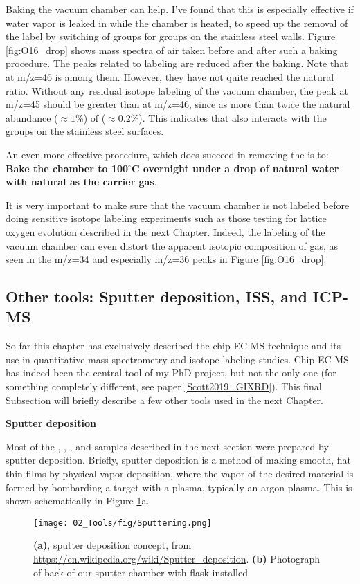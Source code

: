 Baking the vacuum chamber can help. I've found that this is especially effective if water vapor is leaked in while the chamber is heated, to speed up the removal of the  label by switching of  groups for  groups on the stainless steel walls. Figure \ref{fig:O16_drop} shows mass spectra of air taken before and after such a baking procedure. The peaks related to  labeling are reduced after the baking. Note that  at m/z=46 is among them. However, they have not quite reached the natural ratio. Without any residual isotope labeling of the vacuum chamber, the peak at m/z=45 should be greater than at m/z=46, since  as more than twice the natural abundance ($\approx 1$\%) of  ($\approx 0.2$\%). This indicates that  also interacts with the  groups on the stainless steel surfaces. 

An even more effective procedure, which does succeed in removing the  is to: \textbf{Bake the chamber to 100$^\circ$C overnight under a drop of natural water with natural  as the carrier gas}. 

It is very important to make sure that the vacuum chamber is not labeled before doing sensitive isotope labeling experiments such as those testing for lattice oxygen evolution described in the next Chapter. Indeed, the labeling of the vacuum chamber can even distort the apparent isotopic composition of  gas, as seen in the m/z=34 and especially m/z=36 peaks in Figure \ref{fig:O16_drop}.

\subsection{Other tools: Sputter deposition, ISS, and ICP-MS}\label{subsec:other_tools}

So far this chapter has exclusively described the chip EC-MS technique and its use in quantitative mass spectrometry and isotope labeling studies. Chip EC-MS has indeed been the central tool of my PhD project, but not the only one (for something completely different, see paper \ref{Scott2019_GIXRD}). This final Subsection will briefly describe a few other tools used in the next Chapter.

\textbf{Sputter deposition}

Most of the , , , and  samples described in the next section were prepared by sputter deposition. Briefly, sputter deposition is a method of making smooth, flat thin films by physical vapor deposition, where the vapor of the desired material is formed by bombarding a target with a plasma, typically an argon plasma. This is shown schematically in Figure \ref{fig:sputter}a. 
\begin{figure}[h!]
	\centering
	\texttt{[image: 02\_Tools/fig/Sputtering.png]}
	\caption{\textbf{(a)}, sputter deposition concept, from \url{https://en.wikipedia.org/wiki/Sputter_deposition}. \textbf{(b)} Photograph of back of our sputter chamber with  flask installed }
	\label{fig:sputter}
\end{figure}

